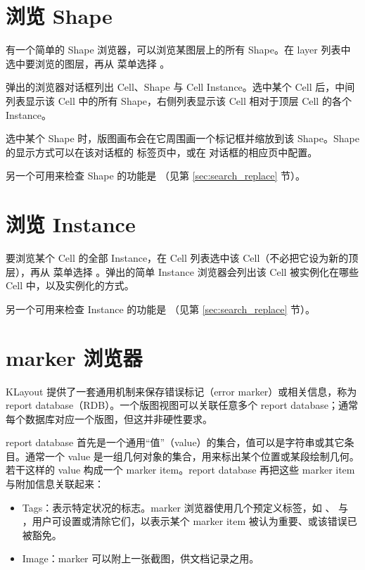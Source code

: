 \section{浏览 Shape}\label{sec:browse_shapes}

有一个简单的 Shape 浏览器，可以浏览某图层上的所有 Shape。在 layer 列表中选中要浏览的图层，再从  菜单选择 。

弹出的浏览器对话框列出 Cell、Shape 与 Cell Instance。选中某个 Cell 后，中间列表显示该 Cell 中的所有 Shape，右侧列表显示该 Cell 相对于顶层 Cell 的各个 Instance。

选中某个 Shape 时，版图画布会在它周围画一个标记框并缩放到该 Shape。Shape 的显示方式可以在该对话框的  标签页中，或在  对话框的相应页中配置。

另一个可用来检查 Shape 的功能是 （见第 \ref{sec:search_replace} 节）。

\section{浏览 Instance}\label{sec:browse_instances}

要浏览某个 Cell 的全部 Instance，在 Cell 列表选中该 Cell（不必把它设为新的顶层），再从  菜单选择 。弹出的简单 Instance 浏览器会列出该 Cell 被实例化在哪些 Cell 中，以及实例化的方式。

另一个可用来检查 Instance 的功能是 （见第 \ref{sec:search_replace} 节）。

\section{marker 浏览器}\label{sec:marker_browser}

KLayout 提供了一套通用机制来保存错误标记（error marker）或相关信息，称为 report database（RDB）。一个版图视图可以关联任意多个 report database；通常每个数据库对应一个版图，但这并非硬性要求。

report database 首先是一个通用“值”（value）的集合，值可以是字符串或其它条目。通常一个 value 是一组几何对象的集合，用来标出某个位置或某段绘制几何。若干这样的 value 构成一个 marker item。report database 再把这些 marker item 与附加信息关联起来：

\begin{itemize}
\item Tags：表示特定状况的标志。marker 浏览器使用几个预定义标签，如 、 与 ，用户可设置或清除它们，以表示某个 marker item 被认为重要、或该错误已被豁免。
\item Image：marker 可以附上一张截图，供文档记录之用。
\end{itemize}

